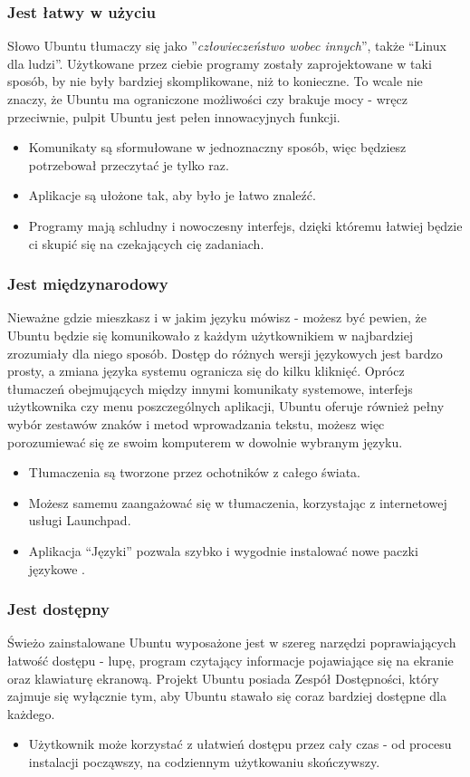 \subsubsection{Jest łatwy w użyciu}
Słowo Ubuntu tłumaczy się jako ”\textit{człowieczeństwo wobec innych}”,  także “Linux dla ludzi”. Użytkowane przez ciebie programy zostały zaprojektowane w taki sposób, by nie były bardziej skomplikowane, niż to konieczne. To wcale nie znaczy, że Ubuntu ma ograniczone możliwości czy brakuje mocy - wręcz przeciwnie, pulpit Ubuntu jest pełen innowacyjnych funkcji.
\begin{itemize}
\item Komunikaty są sformułowane w jednoznaczny sposób, więc będziesz potrzebował przeczytać je tylko raz.
\item Aplikacje są ułożone tak, aby było je łatwo znaleźć.
\item Programy mają schludny i nowoczesny interfejs, dzięki któremu łatwiej będzie ci skupić się na czekających cię zadaniach.
\end{itemize}
\subsubsection{Jest międzynarodowy}
Nieważne gdzie mieszkasz i w jakim języku mówisz - możesz być pewien, że Ubuntu będzie się komunikowało z każdym użytkownikiem w najbardziej zrozumiały dla niego sposób. Dostęp do różnych wersji językowych jest bardzo prosty, a zmiana języka systemu ogranicza się do kilku kliknięć.
Oprócz  tłumaczeń obejmujących między innymi komunikaty systemowe, interfejs użytkownika czy menu poszczególnych aplikacji, Ubuntu oferuje również pełny wybór zestawów znaków i metod wprowadzania tekstu, możesz więc porozumiewać się ze swoim komputerem w dowolnie wybranym języku.
\begin{itemize}
\item Tłumaczenia są tworzone przez ochotników z całego świata.
\item Możesz samemu zaangażować się w tłumaczenia, korzystając z internetowej usługi Launchpad.
\item Aplikacja “Języki” pozwala szybko i wygodnie instalować nowe paczki językowe .
\end{itemize}
\subsubsection{Jest dostępny}
Świeżo zainstalowane Ubuntu wyposażone jest w szereg narzędzi poprawiających łatwość dostępu - lupę, program czytający informacje pojawiające się na ekranie oraz klawiaturę ekranową. Projekt Ubuntu posiada Zespół Dostępności, który zajmuje się wyłącznie tym, aby Ubuntu stawało się coraz bardziej dostępne dla każdego.
\begin{itemize}
\item Użytkownik może korzystać z ułatwień dostępu przez cały czas - od procesu instalacji począwszy, na codziennym użytkowaniu skończywszy.
\end{itemize}
